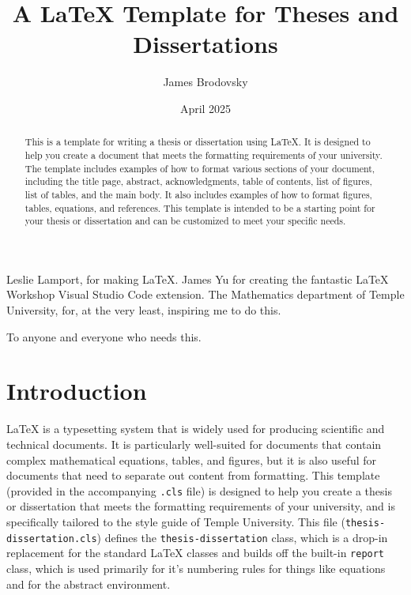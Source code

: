 \documentclass{thesis-dissertation}
\title{A \LaTeX{} Template for Theses and Dissertations}
\author{James Brodovsky}        %
\date{April 2025}               %
\begin{document}
\newtheorem{notation}{Notation}[chapter]
\newtheorem{rem}{Remark}[chapter]
\newtheorem{lem}{Lemma}[chapter]
\newtheorem{cor}{Corollary}[chapter]
\newtheorem{tem}{Theorem}[chapter]
\newtheorem{prop}{Proposition}[chapter]
\newtheorem{example}{Example}[chapter]
\newtheorem{define}{Definition}[chapter]

\maketitlepage{}

\begin{abstract}
  This is a template for writing a thesis or dissertation using \LaTeX{}. It is designed to help you create a document that meets the formatting requirements of your university. The template includes examples of how to format various sections of your document, including the title page, abstract, acknowledgments, table of contents, list of figures, list of tables, and the main body. It also includes examples of how to format figures, tables, equations, and references. This template is intended to be a starting point for your thesis or dissertation and can be customized to meet your specific needs.
\end{abstract}

\begin{acknowledgments}
  Leslie Lamport, for making \LaTeX{}. James Yu for creating the fantastic LaTeX Workshop Visual Studio Code extension. The Mathematics department of Temple University, for, at the very least, inspiring me to do this.
\end{acknowledgments}

\begin{dedication}
  To anyone and everyone who needs this.
\end{dedication}

\singlespacing{}
\tableofcontents{}
\listoffigures{}
\listoftables{}

\newpage{}
\doublespacing{}

\chapter{Introduction}
\LaTeX{} is a typesetting system that is widely used for producing scientific and technical documents. It is particularly well-suited for documents that contain complex mathematical equations, tables, and figures, but it is also useful for documents that need to separate out content from formatting. This template (provided in the accompanying \texttt{.cls} file) is designed to help you create a thesis or dissertation that meets the formatting requirements of your university, and is specifically tailored to the style guide of Temple University. This file (\texttt{thesis-dissertation.cls}) defines the \texttt{thesis-dissertation} class, which is a drop-in replacement for the standard \LaTeX{} classes and builds off the built-in \texttt{report} class, which is used primarily for it's numbering rules for things like equations and for the abstract environment.
\end{document}
